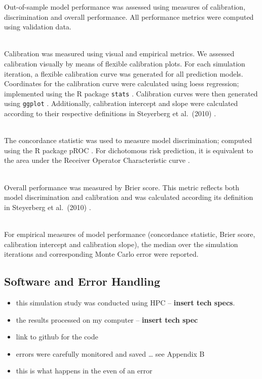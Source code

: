 \documentclass[AMA,STIX1COL,]{WileyNJD-v2}
\begin{document}
Out-of-sample model performance was assessed using measures of
calibration, discrimination and overall performance. All performance
metrics were computed using validation data.\\
\strut \\
Calibration was measured using visual and empirical metrics. We assessed
calibration visually by means of flexible calibration plots. For each
simulation iteration, a flexible calibration curve was generated for all
prediction models. Coordinates for the calibration curve were calculated
using loess regression; implemented using the R package \texttt{stats}
\citep{loess}. Calibration curves were then generated using
\texttt{ggplot} \citep{gg}. Additionally, calibration intercept and
slope were calculated according to their respective definitions in
Steyerberg et al.~(2010) \citep{epi}.\\
\strut \\
The concordance statistic was used to measure model discrimination;
computed using the R package pROC \citep{pROC}. For dichotomous risk
prediction, it is equivalent to the area under the Receiver Operator
Characteristic curve \citep{epi}.\\
\strut \\
Overall performance was measured by Brier score. This metric reflects
both model discrimination and calibration and was calculated according
its definition in Steyerberg et al.~(2010) \citep{epi}.\\
\strut \\
For empirical measures of model performance (concordance statistic,
Brier score, calibration intercept and calibration slope), the median
over the simulation iterations and corresponding Monte Carlo error were
reported.

\hypertarget{software-and-error-handling}{%
\subsection{Software and Error
Handling}\label{software-and-error-handling}}

\begin{itemize}
\item
  this simulation study was conducted using HPC -- \textbf{insert tech
  specs}.
\item
  the results processed on my computer -- \textbf{insert tech spec}
\item
  link to github for the code
\item
  errors were carefully monitored and saved \ldots{} see Appendix B
\item
  this is what happens in the even of an error
\end{itemize}
\end{document}
